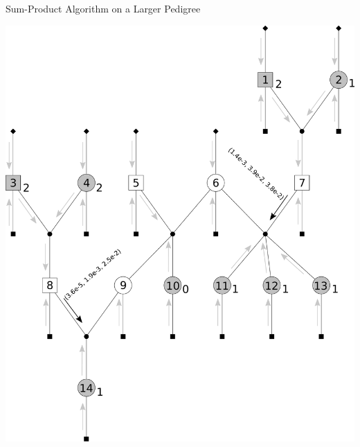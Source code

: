 \documentclass[letter,graphicx]{beamer}
\begin{document}
\begin{frame}{Sum-Product Algorithm on a Larger Pedigree} 
\begin{center} 
\includegraphics[height = 0.8\textheight]{./images/mg-example-step4.pdf} 
\end{center}
\end{frame}
\end{document}
